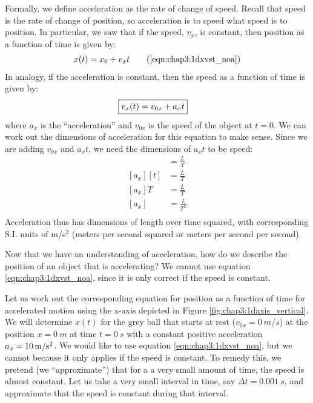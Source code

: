 Formally, we define acceleration as the rate of change of speed. Recall that speed is the rate of change of position, so acceleration is to speed what speed is to position. In particular, we saw that if the speed, $v_x$, is constant, then position as a function of time is given by:
\begin{align}
x(t) = x_0 + v_xt \tag{\ref{eqn:chap3:1dxvst_noa}}
\end{align} 
In analogy, if the acceleration is constant, then the speed as a function of time is given by:
\begin{align}
\label{eqn:chap3L1dvvst}
\Aboxed{v_x(t) = v_{0x} + a_xt }
\end{align}
where $a_x$ is the ``acceleration'' and $v_{0x}$ is the speed of the object at $t=0$. We can work out the dimensions of acceleration for this equation to make sense. Since we are adding $v_{0x}$ and $a_xt$, we need the dimensions of $a_xt$ to be speed:
\begin{align*}
[a_xt] &= \frac{L}{T} \\
[a_x][t] &= \frac{L}{T} \\
[a_x]T&= \frac{L}{T} \\
[a_x]&= \frac{L}{T^2} \\
\end{align*}
Acceleration thus has dimensions of length over time squared, with corresponding S.I. units of m/s$^2$ (meters per second squared or meters per second per second). 

Now that we have an understanding of acceleration, how do we describe the position of an object that is accelerating? We cannot use equation \ref{eqn:chap3:1dxvst_noa}, since it is only correct if the speed is constant. 


Let us work out the corresponding equation for position as a function of time for accelerated motion using the x-axis depicted in Figure \ref{fig:chap3:1daxis_vertical}. We will determine $x(t)$ for the grey ball that starts at rest ($v_{0x}=\SI{0}{m\per s}$) at the position $x=\SI{0}{m}$ at time $t=\SI{0}{s}$ with a constant positive acceleration $a_x=\SI{10}{m\per s\squared}$. We would like to use equation \ref{eqn:chap3:1dxvst_noa}, but we cannot because it only applies if the speed is constant. To remedy this, we pretend (we ``approximate'') that for a a very small amount of time, the speed is almost constant. Let us take a very small interval in time, say $\Delta t=\SI{0.001}{s}$, and approximate that the speed is constant during that interval. 

